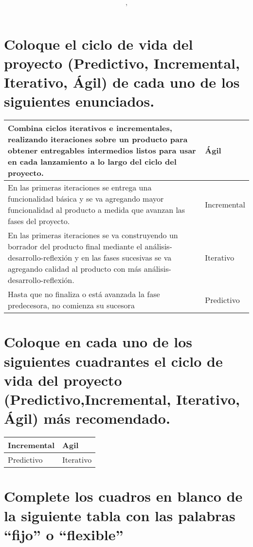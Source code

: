 \documentclass{article}
\author{\nombre , \carnet}
\title{\textbf{\Huge\titulo}}
\begin{document}
\maketitle
\section{Coloque el ciclo de vida del proyecto (Predictivo, Incremental, Iterativo, Ágil) de cada uno de los siguientes enunciados.}
\begin{tabular}{  | m{12cm} | m{3cm} | }
	\hline
	\parbox[t]{12cm}{
	 Combina ciclos iterativos e incrementales,
	 realizando iteraciones sobre un 
	 producto para obtener entregables intermedios
	 listos para usar en cada 
	 lanzamiento a lo largo del ciclo del proyecto.
	} & Ágil \\\hline
	 \parbox[t]{12cm} {
		 En las primeras iteraciones se entrega una funcionalidad básica y se va
		 agregando mayor funcionalidad al producto a medida que avanzan las
		 fases del proyecto.
	}	& Incremental \\\hline
	 \parbox[t]{12cm} {
En las primeras iteraciones se va construyendo un borrador del producto
final mediante el análisis-desarrollo-reflexión y en las fases sucesivas se va
agregando calidad al producto con más análisis-desarrollo-reflexión.
	}	& Iterativo \\\hline
	 \parbox[t]{12cm} {
		 Hasta que no finaliza o está avanzada la fase predecesora, no comienza su sucesora
	}	& Predictivo \\\hline
\end{tabular}

\section{ Coloque en cada uno de los siguientes cuadrantes
el ciclo de vida del proyecto (Predictivo,Incremental, Iterativo, Ágil) más recomendado.}
\begin{center}
\begin{tabular}{ | m{6cm} | m{6cm} |  }
	\hline
  Incremental & Agil \\\hline
  Predictivo & Iterativo \\\hline
\end{tabular}
\end{center}
\section{Complete los cuadros en blanco de la siguiente 
tabla con las palabras ``fijo'' o ``flexible'' }
\end{document}
